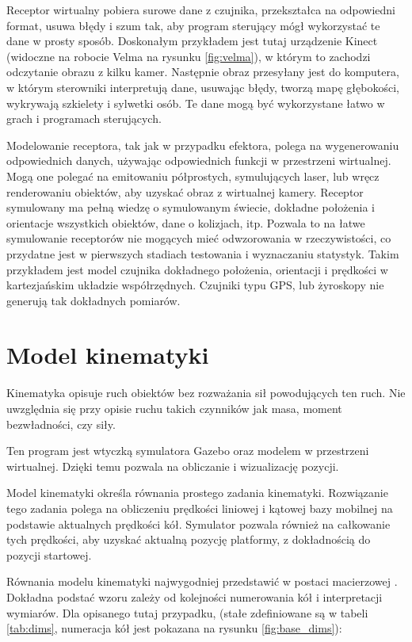 	Receptor wirtualny pobiera surowe dane z czujnika, przekształca na odpowiedni format, usuwa błędy i szum tak, aby program sterujący mógł wykorzystać te dane w prosty sposób. 
	Doskonałym przykładem jest tutaj urządzenie Kinect (widoczne na robocie Velma na rysunku \ref{fig:velma}), w którym to zachodzi odczytanie obrazu z kilku kamer.
	Następnie obraz przesyłany jest do komputera, w którym sterowniki interpretują dane, usuwając błędy, tworzą mapę głębokości, wykrywają szkielety i sylwetki osób.
	Te dane mogą być wykorzystane łatwo w grach i programach sterujących.

	Modelowanie receptora, tak jak w przypadku efektora, polega na wygenerowaniu odpowiednich danych, używając odpowiednich funkcji w przestrzeni wirtualnej.
	Mogą one polegać na emitowaniu półprostych, symulujących laser, lub wręcz renderowaniu obiektów, aby uzyskać obraz z wirtualnej kamery.
	Receptor symulowany ma pełną wiedzę o symulowanym świecie, dokładne położenia i orientacje wszystkich obiektów, dane o kolizjach, itp. 
	Pozwala to na łatwe symulowanie receptorów nie mogących mieć odwzorowania w rzeczywistości, co przydatne jest w pierwszych stadiach testowania i wyznaczaniu statystyk.
	Takim przykładem jest model czujnika dokładnego położenia, orientacji i prędkości w kartezjańskim układzie współrzędnych. 
	Czujniki typu GPS, lub żyroskopy nie generują tak dokładnych pomiarów.


\section{Model kinematyki}
	\label{sec:pseudovelma}
	Kinematyka opisuje ruch obiektów bez rozważania sił powodujących ten ruch.
	Nie uwzględnia się przy opisie ruchu takich czynników jak masa, moment bezwładności, czy siły.
	
	Ten program jest wtyczką symulatora Gazebo oraz modelem w przestrzeni wirtualnej.
	Dzięki temu pozwala na obliczanie i wizualizację pozycji.
	
	Model kinematyki określa równania prostego zadania kinematyki. 
	Rozwiązanie tego zadania polega na obliczeniu prędkości liniowej i kątowej bazy mobilnej na podstawie aktualnych prędkości kół.
	Symulator pozwala również na całkowanie tych prędkości, aby uzyskać aktualną pozycję platformy, z dokładnością do pozycji startowej.
	
	Równania modelu kinematyki najwygodniej przedstawić w postaci macierzowej \cite{wheels}. 
	Dokładna podstać wzoru zależy od kolejności numerowania kół i interpretacji wymiarów.
	Dla opisanego tutaj przypadku, (stałe zdefiniowane są w tabeli \ref{tab:dims}, numeracja kół jest pokazana na rysunku \ref{fig:base_dims}):
	

